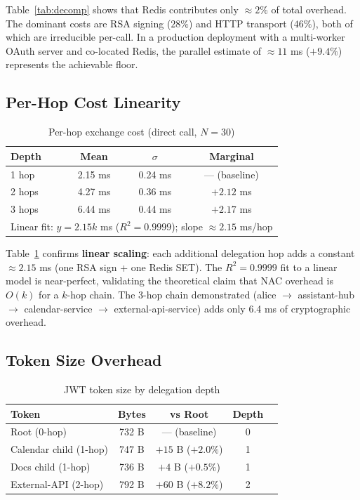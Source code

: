 \documentclass[journal]{IEEEtran}
\begin{document}
Table~\ref{tab:decomp} shows that Redis contributes only $\approx 2\%$ of total overhead. The dominant costs are RSA signing ($28\%$) and HTTP transport ($46\%$), both of which are irreducible per-call. In a production deployment with a multi-worker OAuth server and co-located Redis, the parallel estimate of $\approx 11$ ms ($+9.4\%$) represents the achievable floor.

\subsection{Per-Hop Cost Linearity}

\begin{table}[h]
\caption{Per-hop exchange cost (direct call, $N=30$)}
\label{tab:hopcosts}
\centering
\footnotesize
\begin{tabular}{lccc}
\toprule
\textbf{Depth} & \textbf{Mean} & \textbf{$\sigma$} & \textbf{Marginal} \\
\midrule
1 hop & 2.15 ms & 0.24 ms & --- (baseline) \\
2 hops & 4.27 ms & 0.36 ms & $+2.12$ ms \\
3 hops & 6.44 ms & 0.44 ms & $+2.17$ ms \\
\midrule
\multicolumn{4}{l}{Linear fit: $y = 2.15k$ ms ($R^2 = 0.9999$); slope $\approx 2.15$ ms/hop} \\
\bottomrule
\end{tabular}
\end{table}

Table~\ref{tab:hopcosts} confirms \textbf{linear scaling}: each additional delegation hop adds a constant $\approx 2.15$ ms (one RSA sign + one Redis SET). The $R^2 = 0.9999$ fit to a linear model is near-perfect, validating the theoretical claim that NAC overhead is $O(k)$ for a $k$-hop chain. The 3-hop chain demonstrated (alice $\to$ assistant-hub $\to$ calendar-service $\to$ external-api-service) adds only 6.4 ms of cryptographic overhead.

\subsection{Token Size Overhead}

\begin{table}[h]
\caption{JWT token size by delegation depth}
\label{tab:tokensizes}
\centering
\footnotesize
\begin{tabular}{lcccc}
\toprule
\textbf{Token} & \textbf{Bytes} & \textbf{vs Root} & \textbf{Depth} \\
\midrule
Root (0-hop)              & 732 B & --- (baseline)          & 0 \\
Calendar child (1-hop)    & 747 B & $+15$ B ($+2.0\%$)     & 1 \\
Docs child (1-hop)        & 736 B & $+4$ B ($+0.5\%$)      & 1 \\
External-API (2-hop)      & 792 B & $+60$ B ($+8.2\%$)     & 2 \\
\bottomrule
\end{tabular}
\end{table}
\end{document}

